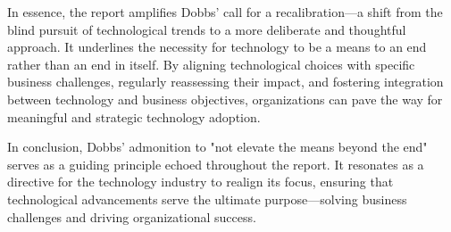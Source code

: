 \documentclass[a4Paper]{article}
\begin{document}
In essence, the report amplifies Dobbs' call for a recalibration—a shift from the blind pursuit of technological trends to a more deliberate and thoughtful approach. It underlines the necessity for technology to be a means to an end rather than an end in itself. By aligning technological choices with specific business challenges, regularly reassessing their impact, and fostering integration between technology and business objectives, organizations can pave the way for meaningful and strategic technology adoption.

In conclusion, Dobbs' admonition to "not elevate the means beyond the end" serves as a guiding principle echoed throughout the report. It resonates as a directive for the technology industry to realign its focus, ensuring that technological advancements serve the ultimate purpose—solving business challenges and driving organizational success.
\pagebreak


\end{document}
